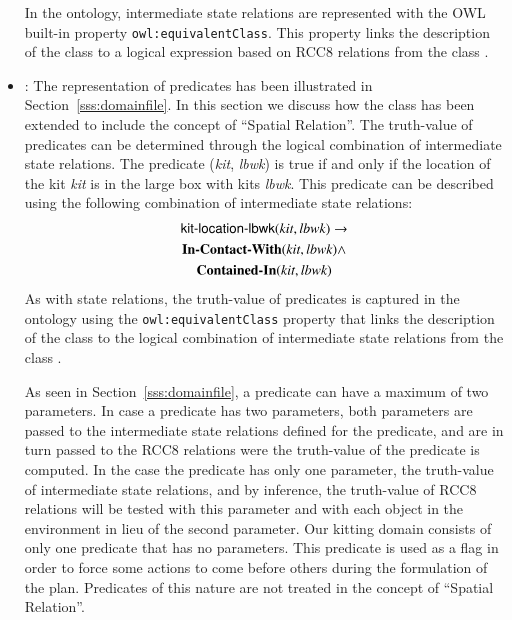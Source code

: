 \begin{itemize}
In the ontology, intermediate state relations are represented with the OWL built-in property
\texttt{owl:equivalentClass}. This property links the description of the class 
to a logical expression based on RCC8 relations from the class .
 \item {}: The representation of predicates has been illustrated in
Section~\ref{sss:domainfile}. In this section we discuss how the class 
has been extended to include the concept of ``Spatial Relation''. The truth-value of
predicates can be determined through the logical combination of intermediate state relations.
The predicate (\textit{kit}, \textit{lbwk}) is true if and only if the
location of the kit \textit{kit} is in the large box with kits \textit{lbwk}. This predicate can
be described using the following combination of intermediate state relations:
\begin{gather}
\textsf{kit-location-lbwk}(\textit{kit}, \textit{lbwk}) \rightarrow   \notag\\
\textbf{In-Contact-With}(\textit{kit}, \textit{lbwk}) \wedge \notag\\
\textbf{Contained-In}(\textit{kit}, \textit{lbwk}) \notag
\end{gather}
As with state relations, the truth-value of predicates is captured in the ontology using the
\texttt{owl:equivalentClass} property that links the description of the class 
to the logical combination of intermediate state relations from the class .

As seen in Section~\ref{sss:domainfile}, a predicate can have a maximum of two parameters.
In case a predicate has two parameters, both parameters are passed to the intermediate
state relations defined for the predicate, and are in turn passed to the RCC8 relations were
the truth-value of the predicate is computed. In the case the predicate has only one parameter,
the truth-value of intermediate state relations, and by inference, the truth-value of RCC8
relations will be tested with this parameter and with each object in the environment in lieu
of the second parameter. Our kitting domain consists of only one predicate that has no parameters.
This predicate is used as a flag in order to force some actions to come before others during the
formulation of the plan. Predicates of this nature are not treated in the concept of ``Spatial Relation''.
\end{itemize}



